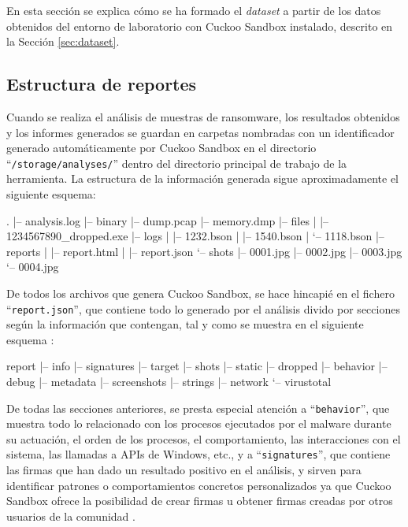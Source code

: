 \noindent En esta sección se explica cómo se ha formado el \textit{dataset} a partir de los datos obtenidos del entorno de laboratorio con Cuckoo Sandbox instalado, descrito en la Sección \ref{sec:dataset}.

\subsection{Estructura de reportes}

\noindent Cuando se realiza el análisis de muestras de ransomware, los resultados obtenidos y los informes generados se guardan en carpetas nombradas con un identificador generado automáticamente por Cuckoo Sandbox en el directorio ``\verb!/storage/analyses/!'' dentro del directorio principal de trabajo de la herramienta. La estructura de la información generada sigue aproximadamente el siguiente esquema:

\begin{listing}[style=consola, numbers=none]
.
|-- analysis.log
|-- binary
|-- dump.pcap
|-- memory.dmp
|-- files
|   |-- 1234567890_dropped.exe
|-- logs
|   |-- 1232.bson
|   |-- 1540.bson
|   `-- 1118.bson
|-- reports
|   |-- report.html
|   |-- report.json
`-- shots
    |-- 0001.jpg
    |-- 0002.jpg
    |-- 0003.jpg
    `-- 0004.jpg
\end{listing}

De todos los archivos que genera Cuckoo Sandbox, se hace hincapié en el fichero ``\verb!report.json!'', que contiene todo lo generado por el análisis divido por secciones según la información que contengan, tal y como se muestra en el siguiente esquema \cite{CKRPRT}:

\begin{listing}[style=consola, numbers=none]
report
|-- info
|-- signatures
|-- target
|-- shots
|-- static
|-- dropped
|-- behavior
|-- debug
|-- metadata
|-- screenshots
|-- strings
|-- network
`-- virustotal
\end{listing}


De todas las secciones anteriores, se presta especial atención a ``\verb!behavior!'', que muestra todo lo relacionado con los procesos ejecutados por el malware durante su actuación, el orden de los procesos, el comportamiento, las interacciones con el sistema, las llamadas a \gls{API}s de Windows, etc., y a ``\verb!signatures!'', que contiene las firmas que han dado un resultado positivo en el análisis, y sirven para identificar patrones o comportamientos concretos personalizados ya que Cuckoo Sandbox ofrece la posibilidad de crear firmas u obtener firmas creadas por otros usuarios de la comunidad \cite{CKRPRT} \cite{CKDOC}. 


